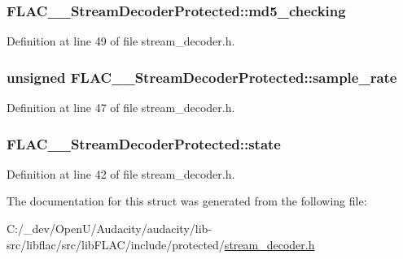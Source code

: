 \subsubsection[{\texorpdfstring{md5\+\_\+checking}{md5_checking}}]{ F\+L\+A\+C\+\_\+\+\_\+\+Stream\+Decoder\+Protected\+::md5\+\_\+checking}\hypertarget{struct_f_l_a_c_____stream_decoder_protected_a7e9d6d7b49d4818180ac9de9a4e989bb}{}\label{struct_f_l_a_c_____stream_decoder_protected_a7e9d6d7b49d4818180ac9de9a4e989bb}


Definition at line 49 of file stream\+\_\+decoder.\+h.

\subsubsection[{\texorpdfstring{sample\+\_\+rate}{sample_rate}}]{\setlength{\rightskip}{0pt plus 5cm}unsigned F\+L\+A\+C\+\_\+\+\_\+\+Stream\+Decoder\+Protected\+::sample\+\_\+rate}\hypertarget{struct_f_l_a_c_____stream_decoder_protected_a0a43404f3ff9e115f6b940447317f79f}{}\label{struct_f_l_a_c_____stream_decoder_protected_a0a43404f3ff9e115f6b940447317f79f}


Definition at line 47 of file stream\+\_\+decoder.\+h.

\subsubsection[{\texorpdfstring{state}{state}}]{ F\+L\+A\+C\+\_\+\+\_\+\+Stream\+Decoder\+Protected\+::state}\hypertarget{struct_f_l_a_c_____stream_decoder_protected_a821004809712ae29f96137b5a3a72057}{}\label{struct_f_l_a_c_____stream_decoder_protected_a821004809712ae29f96137b5a3a72057}


Definition at line 42 of file stream\+\_\+decoder.\+h.



The documentation for this struct was generated from the following file\+:\begin{DoxyCompactItemize}
\item 
C\+:/\+\_\+dev/\+Open\+U/\+Audacity/audacity/lib-\/src/libflac/src/lib\+F\+L\+A\+C/include/protected/\hyperlink{src_2lib_f_l_a_c_2include_2protected_2stream__decoder_8h}{stream\+\_\+decoder.\+h}\end{DoxyCompactItemize}

